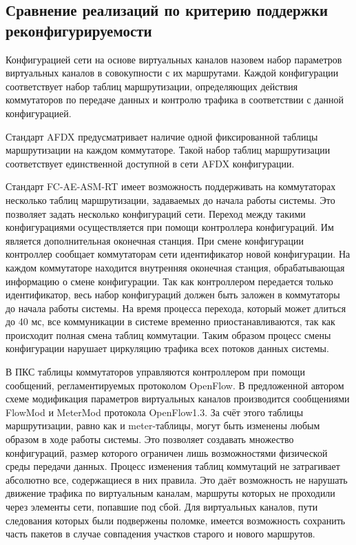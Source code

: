 \documentclass[12pt, a4paper]{article}
\begin{document}
\subsection{Сравнение реализаций по критерию поддержки реконфигурируемости}
Конфигурацией сети на основе виртуальных каналов назовем набор параметров виртуальных каналов в совокупности с их маршрутами. Каждой конфигурации соответствует набор таблиц маршрутизации, определяющих действия коммутаторов по передаче данных и контролю трафика в соответствии с данной конфигурацией.

Стандарт AFDX предусматривает наличие одной фиксированной таблицы маршрутизации на каждом коммутаторе. Такой набор таблиц маршрутизации соответствует единственной доступной в сети AFDX конфигурации.

Стандарт FC-AE-ASM-RT имеет возможность поддерживать на коммутаторах несколько таблиц маршрутизации, задаваемых до начала работы системы. Это позволяет задать несколько конфигураций сети. Переход между такими конфигурациями осуществляется при помощи контроллера конфигураций. Им является дополнительная оконечная станция. При смене конфигурации контроллер сообщает коммутаторам сети идентификатор новой конфигурации. На каждом коммутаторе находится внутренняя оконечная станция, обрабатывающая информацию о смене конфигурации. Так как контроллером передается только идентификатор, весь набор конфигураций должен быть заложен в коммутаторы до начала работы системы. На время процесса перехода, который может длиться до 40 мс, все коммуникации в системе временно приостанавливаются, так как происходит полная смена таблиц коммутации. Таким образом процесс смены конфигурации нарушает циркуляцию трафика всех потоков данных системы.

В ПКС таблицы коммутаторов управляются контроллером при помощи сообщений, регламентируемых протоколом OpenFlow. В предложенной автором схеме модификация параметров виртуальных каналов производится сообщениями FlowMod и MeterMod протокола OpenFlow1.3. За счёт этого таблицы маршрутизации, равно как и meter-таблицы, могут быть изменены любым образом в ходе работы системы. Это позволяет создавать множество конфигураций, размер которого ограничен лишь возможностями физической среды передачи данных. Процесс изменения таблиц коммутаций не затрагивает абсолютно все, содержащиеся в них правила. Это даёт возможность не нарушать движение трафика по виртуальным каналам, маршруты которых не проходили через элементы сети, попавшие под сбой. Для виртуальных каналов, пути следования которых были подвержены поломке, имеется возможность сохранить часть пакетов в случае совпадения участков старого и нового маршрутов. 
\end{document}

